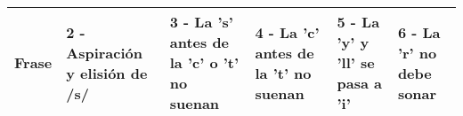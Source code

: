 
\begin{landscape}
\scriptsize
\begin{longtable}{| p{} || p{} | p{} | p{} | p{}| p{} | } 
	\hline
	\textbf{Frase} & \textbf{2 - Aspiración y elisión de /s/} & \textbf{3 - La 's' antes de la 'c' o 't' no suenan} & \textbf{4 - La 'c' antes de la 't' no suenan}& \textbf{5 - La 'y' y 'll' se pasa a 'i'} & \textbf{6 - La 'r' no debe sonar} \\ \hline	
	

\end{longtable}
\end{landscape}
